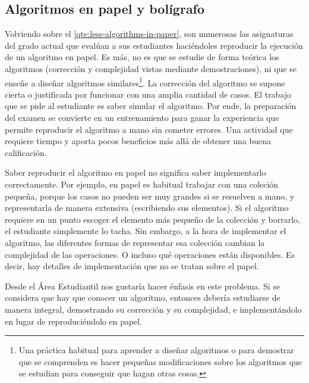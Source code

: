 \subsection{Algoritmos en papel y bolígrafo}

Volviendo sobre el \cref{qte:less-algorithms-in-paper},
son numerosas las asignaturas del grado actual que
evalúan a sus estudiantes haciéndoles reproducir
la ejecución de un algoritmo en papel.
Es más, no es que se estudie de forma teórica los algoritmos
(corrección y complejidad vistas mediante demostraciones),
ni que se enseñe a diseñar algoritmos similares\footnote{
    Una práctica habitual para aprender a diseñar algoritmos
    o para demostrar que se comprenden es hacer pequeñas modificaciones
    sobre los algoritmos que se estudian para conseguir que hagan otras cosas.
}.
La corrección del algoritmo se supone cierta o
justificada por funcionar con una amplia cantidad de casos.
El trabajo que se pide al estudiante es saber simular el algoritmo.
Por ende, la preparación del examen se convierte en un entrenamiento
para ganar la experiencia que permite
reproducir el algoritmo a mano sin cometer errores.
Una actividad que requiere tiempo y aporta pocos beneficios
más allá de obtener una buena calificación.

Saber reproducir el algoritmo en papel
no significa saber implementarlo correctamente.
Por ejemplo, en papel es habitual trabajar con una coleción pequeña,
porque los casos no pueden ser muy grandes si se resuelven a mano,
y representarla de manera extensiva (escribiendo sus elementos).
Si el algoritmo requiere en un punto
escoger el elemento más pequeño de la colección y borrarlo,
el estudiante simplemente lo tacha.
Sin embargo, a la hora de implementar el algoritmo,
las diferentes formas de representar esa colección cambian
la complejidad de las operaciones.
O incluso qué operaciones están disponibles.
Es decir, hay detalles de implementación que no se tratan sobre el papel.

Desde el Área Estudiantil nos gustaría hacer énfasis en este problema.
Si se considera que hay que conocer un algoritmo,
entonces debería estudiarse de manera integral,
demostrando su corrección y su complejidad,
e implementándolo en lugar de reproduciéndolo en papel.



